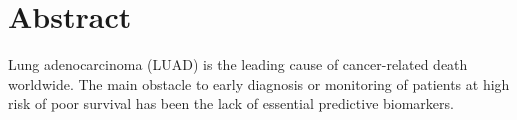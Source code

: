 \documentclass[
10pt, %
a4paper, %
oneside, %
headinclude,footinclude, %
BCOR5mm, %
]{scrartcl}
\title{\normalfont\spacedallcaps{Differential Analyses of Gene Expression}} %
\author{\spacedlowsmallcaps{John Smith \& James Smith}\\ \spacedlowsmallcaps{Group nn}} %
\date{} %
\begin{document}

\renewcommand{\sectionmark}[1]{\markright{\spacedlowsmallcaps{#1}}} %
\lehead{\mbox{\llap{\small\thepage\kern1em\color{halfgray} \vline}\color{halfgray}\hspace{0.5em}\rightmark\hfil}} %

\pagestyle{scrheadings} %


\maketitle %

\setcounter{tocdepth}{2} %

\tableofcontents %

\listoffigures %



\section*{Abstract} %

Lung adenocarcinoma (LUAD) is the leading cause of cancer-related death worldwide. The main obstacle to early diagnosis or monitoring of patients at high risk of poor survival has been the lack of essential predictive biomarkers.
\end{document}
